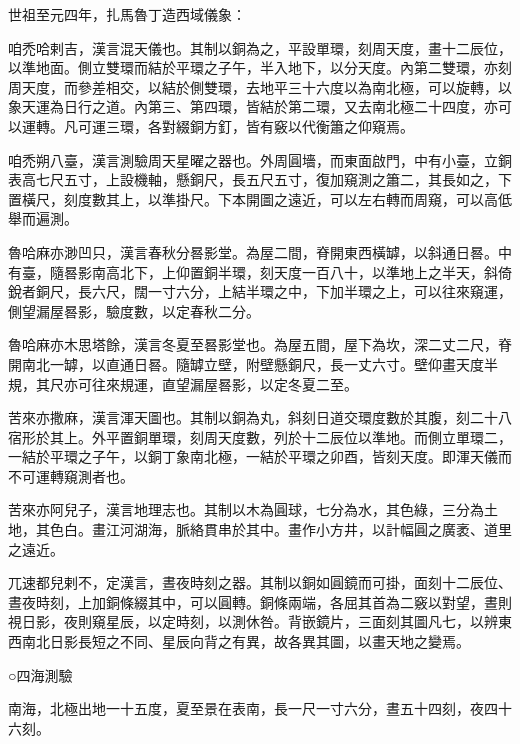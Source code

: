 \begin{pinyinscope}
 世祖至元四年，扎馬魯丁造西域儀象：



 咱禿哈剌吉，漢言混天儀也。其制以銅為之，平設單環，刻周天度，畫十二辰位，以準地面。側立雙環而結於平環之子午，半入地下，以分天度。內第二雙環，亦刻周天度，而參差相交，以結於側雙環，去地平三十六度以為南北極，可以旋轉，以象天運為日行之道。內第三、第四環，皆結於第二環，又去南北極二十四度，亦可以運轉。凡可運三環，各對綴銅方釘，皆有竅以代衡簫之仰窺焉。



 咱禿朔八臺，漢言測驗周天星曜之器也。外周圓墻，而東面啟門，中有小臺，立銅表高七尺五寸，上設機軸，懸銅尺，長五尺五寸，復加窺測之簫二，其長如之，下置橫尺，刻度數其上，以準掛尺。下本開圖之遠近，可以左右轉而周窺，可以高低舉而遍測。



 魯哈麻亦渺凹只，漢言春秋分晷影堂。為屋二間，脊開東西橫罅，以斜通日晷。中有臺，隨晷影南高北下，上仰置銅半環，刻天度一百八十，以準地上之半天，斜倚銳者銅尺，長六尺，闊一寸六分，上結半環之中，下加半環之上，可以往來窺運，側望漏屋晷影，驗度數，以定春秋二分。



 魯哈麻亦木思塔餘，漢言冬夏至晷影堂也。為屋五間，屋下為坎，深二丈二尺，脊開南北一罅，以直通日晷。隨罅立壁，附壁懸銅尺，長一丈六寸。壁仰畫天度半規，其尺亦可往來規運，直望漏屋晷影，以定冬夏二至。



 苦來亦撒麻，漢言渾天圖也。其制以銅為丸，斜刻日道交環度數於其腹，刻二十八宿形於其上。外平置銅單環，刻周天度數，列於十二辰位以準地。而側立單環二，一結於平環之子午，以銅丁象南北極，一結於平環之卯酉，皆刻天度。即渾天儀而不可運轉窺測者也。



 苦來亦阿兒子，漢言地理志也。其制以木為圓球，七分為水，其色綠，三分為土地，其色白。畫江河湖海，脈絡貫串於其中。畫作小方井，以計幅圓之廣袤、道里之遠近。



 兀速都兒剌不，定漢言，晝夜時刻之器。其制以銅如圓鏡而可掛，面刻十二辰位、晝夜時刻，上加銅條綴其中，可以圓轉。銅條兩端，各屈其首為二竅以對望，晝則視日影，夜則窺星辰，以定時刻，以測休咎。背嵌鏡片，三面刻其圖凡七，以辨東西南北日影長短之不同、星辰向背之有異，故各異其圖，以畫天地之變焉。



 ○四海測驗



 南海，北極出地一十五度，夏至景在表南，長一尺一寸六分，晝五十四刻，夜四十六刻。




\end{pinyinscope}
